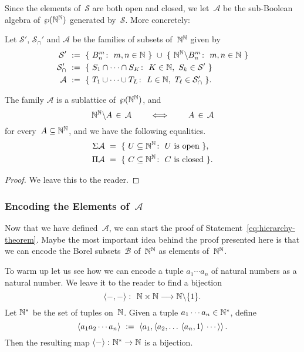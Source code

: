 Since the elements of~$\mathcal{S}$ are both open and closed,
we let~$\mathcal{A}$ be the sub-Boolean algebra
of~$\wp(\mathbb{N}^{\mathbb{N}})$
generated by~$\mathcal{S}$.
More concretely:
\begin{dfn}\label{D:bhier-A}
Let $\mathcal{S}'$, $\mathcal{S}_\cap'$
and $\mathcal{A}$ be the families of subsets of~$\mathbb{N}^{\mathbb{N}}$ given by
\begin{alignat*}{3}
\mathcal{S}' 
\ &\eqdf\ 
\{\ B^m_n \colon \ m,n\in\N \ \}
\ \cup\ 
\{\ \N^\N\backslash B^m_n \colon \ m,n\in\N \ \}\\
\mathcal{S}_\cap'
\ &\eqdf\ 
\{ \ S_1 \cap \dotsb\cap S_K\colon\ 
K\in\N,\  S_k\in \mathcal{S}'\ \} \\ 
\mathcal{A}
\ &\eqdf\ 
\{ \ T_1 \cup \dotsb\cup T_L\colon\ 
L\in\N,\  T_\ell\in \mathcal{S}_\cap'\ \}.
\end{alignat*}
\end{dfn}
\begin{lem}
The family
$\mathcal{A}$
is a sublattice of~$\wp(\mathbb{N}^{\mathbb{N}})$,
and 
\begin{equation*}
\mathbb{N}^{\mathbb{N}}\backslash A\,\in\,\mathcal{A}
\qquad\iff\qquad
A\,\in\,\mathcal{A}
\end{equation*}
for every~$A\subseteq\mathbb{N}^{\mathbb{N}}$,
and we have the following equalities.
\begin{alignat*}{3}
\Sigma\mathcal{A} \ &=\ 
\{ \ U\subseteq \N^\N\colon\ U\text{ is open}\ \},\\
\Pi\mathcal{A} \ &=\ 
\{ \ C\subseteq \N^\N\colon \ C\text{ is closed}\ \}.
\end{alignat*}
\end{lem}
\begin{proof}
We leave this to the reader.
\end{proof}


\subsubsection{Encoding the Elements of~$\mathcal{A}$}$\,$\\
Now that we have defined~$\mathcal{A}$,
we can start the proof of
 Statement~\eqref{eq:hierarchy-theorem}.
Maybe the most important idea behind the proof presented here
is that 
we can
encode the  Borel subsets~$\mathcal{B}$ of~$\mathbb{N}^{\mathbb{N}}$
as elements of~$\mathbb{N}^{\mathbb{N}}$.

To warm up
let us see how we can encode 
a tuple $a_1 \dotsb a_n$ of natural numbers as a natural number.
We leave it to the reader to 
find a bijection
\begin{equation*}
\left< -,-\right>\colon \ \mathbb{N}\times \mathbb{N} \longrightarrow \mathbb{N} \backslash\{1\}.
\end{equation*}
Let $\mathbb{N}^*$ be the set of tuples on~$\mathbb{N}$.
Given a tuple $a_1\dotsb a_n \in \mathbb{N}^*$, define
\begin{equation*}
\left< a_1a_2  \dotsb a_n \right>\ \eqdf\ 
\left<a_1, \left<a_2,\dotsc \,\left<a_n, 1 \right>\,\dotsb\,\right>\right>.
\end{equation*}
Then the resulting map  $\left<-\right>\colon \mathbb{N}^* \rightarrow \mathbb{N}$
is a bijection.

